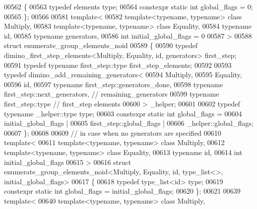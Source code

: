 \begin{DoxyCode}
00562 \{
00563   \textcolor{keyword}{typedef} elements type;
00564   constexpr \textcolor{keyword}{static} \textcolor{keywordtype}{int} global\_flags = 0;
00565 \};
00566 
00581 \textcolor{keyword}{template}<
00582   \textcolor{keyword}{template}<\textcolor{keyword}{typename}, \textcolor{keyword}{typename}> \textcolor{keyword}{class }Multiply,
00583   \textcolor{keyword}{template}<\textcolor{keyword}{typename}, \textcolor{keyword}{typename}> \textcolor{keyword}{class }Equality,
00584   \textcolor{keyword}{typename} id,
00585   \textcolor{keyword}{typename} generators,
00586   \textcolor{keywordtype}{int} initial\_global\_flags = 0
00587 >
00588 \textcolor{keyword}{struct }enumerate\_group\_elements\_noid
00589 \{
00590   \textcolor{keyword}{typedef} dimino\_first\_step\_elements<Multiply, Equality, id, generators> first\_step;
00591   \textcolor{keyword}{typedef} \textcolor{keyword}{typename} first\_step::type first\_step\_elements;
00592 
00593   \textcolor{keyword}{typedef} dimino\_add\_remaining\_generators<
00594     Multiply,
00595     Equality,
00596     id,
00597     \textcolor{keyword}{typename} first\_step::generators\_done,
00598     \textcolor{keyword}{typename} first\_step::next\_generators, \textcolor{comment}{// remaining\_generators}
00599     \textcolor{keyword}{typename} first\_step::type \textcolor{comment}{// first\_step elements}
00600   > \_helper;
00601 
00602   \textcolor{keyword}{typedef} \textcolor{keyword}{typename} \_helper::type type;
00603   constexpr \textcolor{keyword}{static} \textcolor{keywordtype}{int} global\_flags =
00604     initial\_global\_flags |
00605     first\_step::global\_flags |
00606     \_helper::global\_flags;
00607 \};
00608 
00609 \textcolor{comment}{// in case when no generators are specified}
00610 \textcolor{keyword}{template}<
00611   \textcolor{keyword}{template}<\textcolor{keyword}{typename}, \textcolor{keyword}{typename}> \textcolor{keyword}{class }Multiply,
00612   \textcolor{keyword}{template}<\textcolor{keyword}{typename}, \textcolor{keyword}{typename}> \textcolor{keyword}{class }Equality,
00613   \textcolor{keyword}{typename} id,
00614   \textcolor{keywordtype}{int} initial\_global\_flags
00615 >
00616 \textcolor{keyword}{struct }enumerate\_group\_elements\_noid<Multiply, Equality, id, type\_list<>, initial\_global\_flags>
00617 \{
00618   \textcolor{keyword}{typedef} type\_list<id> type;
00619   constexpr \textcolor{keyword}{static} \textcolor{keywordtype}{int} global\_flags = initial\_global\_flags;
00620 \};
00621 
00639 \textcolor{keyword}{template}<
00640   \textcolor{keyword}{template}<\textcolor{keyword}{typename}, \textcolor{keyword}{typename}> \textcolor{keyword}{class }Multiply,

\end{DoxyCode}
